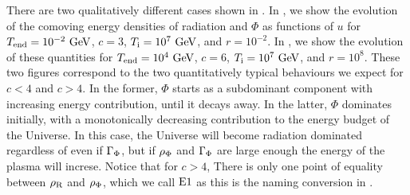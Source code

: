 \documentclass[11pt,a4paper]{article}
\begin{document}
There are two qualitatively different cases shown in . 
%
In , we show the evolution of the comoving energy densities of radiation and $\Phi$ as functions of $u$ for $T_{\rm end}{}=10^{-2}~{\rm GeV}$, $c=3$, $T_{\rm i}{}=10^7~{\rm GeV}$, and $r=10^{-2}$. In , we show the evolution of these quantities for $T_{\rm end}{}=10^{4}~{\rm GeV}$, $c=6$, $T_{\rm i}{}=10^7~{\rm GeV}$, and $r=10^{8}$. 
%
These two figures correspond to the two quantitatively typical behaviours we expect for $c<4$ and $c>4$. In the former, $\Phi$ starts as a subdominant component with increasing energy contribution, until it decays away. In the latter,  $\Phi$ dominates initially, with a monotonically decreasing contribution to the energy budget of the Universe. In this case, the Universe will become radiation dominated regardless of even if $\Gamma_{\Phi}$, but if $\rho_{\Phi}$ and $\Gamma_{\Phi}$ are large enough the energy of the plasma will increse.  Notice that for $c>4$, There is only one point of equality between $\rho_{\rm R}$ and $\rho_{\Phi}$, which we call ${\rm E1}{}$ as this is the naming conversion in \nsc.
%
\end{document}

